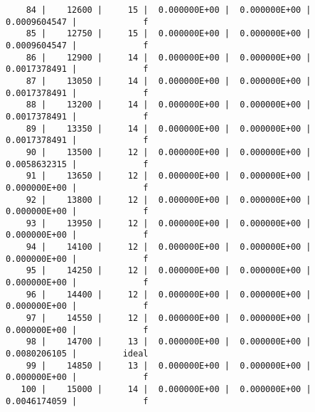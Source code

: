 \documentclass[
  authoryear,
  preprint,
  3p]{elsarticle}
\begin{document}
\begin{verbatim}
    84 |    12600 |     15 |  0.000000E+00 |  0.000000E+00 |  0.0009604547 |             f
    85 |    12750 |     15 |  0.000000E+00 |  0.000000E+00 |  0.0009604547 |             f
    86 |    12900 |     14 |  0.000000E+00 |  0.000000E+00 |  0.0017378491 |             f
    87 |    13050 |     14 |  0.000000E+00 |  0.000000E+00 |  0.0017378491 |             f
    88 |    13200 |     14 |  0.000000E+00 |  0.000000E+00 |  0.0017378491 |             f
    89 |    13350 |     14 |  0.000000E+00 |  0.000000E+00 |  0.0017378491 |             f
    90 |    13500 |     12 |  0.000000E+00 |  0.000000E+00 |  0.0058632315 |             f
    91 |    13650 |     12 |  0.000000E+00 |  0.000000E+00 |  0.000000E+00 |             f
    92 |    13800 |     12 |  0.000000E+00 |  0.000000E+00 |  0.000000E+00 |             f
    93 |    13950 |     12 |  0.000000E+00 |  0.000000E+00 |  0.000000E+00 |             f
    94 |    14100 |     12 |  0.000000E+00 |  0.000000E+00 |  0.000000E+00 |             f
    95 |    14250 |     12 |  0.000000E+00 |  0.000000E+00 |  0.000000E+00 |             f
    96 |    14400 |     12 |  0.000000E+00 |  0.000000E+00 |  0.000000E+00 |             f
    97 |    14550 |     12 |  0.000000E+00 |  0.000000E+00 |  0.000000E+00 |             f
    98 |    14700 |     13 |  0.000000E+00 |  0.000000E+00 |  0.0080206105 |         ideal
    99 |    14850 |     13 |  0.000000E+00 |  0.000000E+00 |  0.000000E+00 |             f
   100 |    15000 |     14 |  0.000000E+00 |  0.000000E+00 |  0.0046174059 |             f
\end{verbatim}
\end{document}

